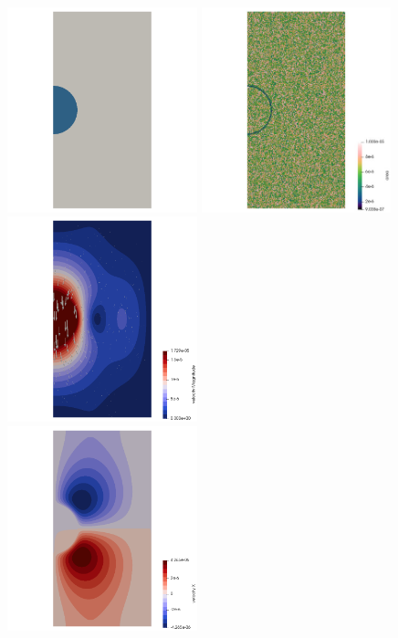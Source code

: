 \begin{center}
\includegraphics[width=5.5cm]{python_codes/fieldstone_92/results/mat}
\includegraphics[width=5.5cm]{python_codes/fieldstone_92/results/area}
\includegraphics[width=5.5cm]{python_codes/fieldstone_92/results/vel}\\
\includegraphics[width=5.5cm]{python_codes/fieldstone_92/results/u}

\end{center}
